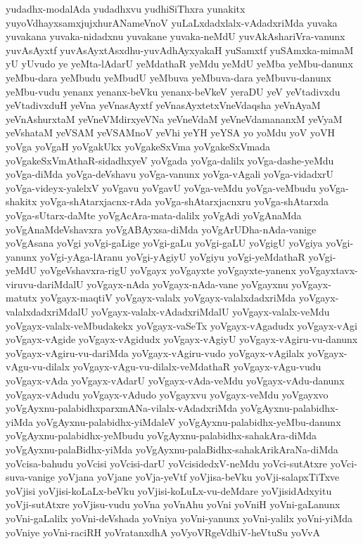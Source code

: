 {yudadhx-modalAda
yudadhxvu
yudhiSiThxra
yunakitx
yuyoVdhayxsamxjujxhurANameVnoV
yuLaLxdadxlalx-vAdadxriMda
yuvaka
yuvakana
yuvaka-nidadxnu
yuvakane
yuvaka-neMdU
yuvAkAshariVra-vanunx
yuvAsAyxtf
yuvAsAyxtAsxdhu-yuvAdhAyxyakaH
yuSamxtf
yuSAmxka-mimaM
yU
yUvudo
ye
yeMta-lAdarU
yeMdathaR
yeMdu
yeMdU
yeMba
yeMbu-danunx
yeMbu-dara
yeMbudu
yeMbudU
yeMbuva
yeMbuva-dara
yeMbuvu-danunx
yeMbu-vudu
yenanx
yenanx-beVku
yenanx-beVkeV
yeraDU
yeV
yeVtadivxdu
yeVtadivxduH
yeVna
yeVnasAyxtf
yeVnasAyxtetxVneVdaqsha
yeVnAyaM
yeVnAshurxtaM
yeVneVMdirxyeVNa
yeVneVdaM
yeVneVdamananxM
yeVyaM
yeVshataM
yeVSAM
yeVSAMnoV
yeVhi
yeYH
yeYSA
yo
yoMdu
yoV
yoVH
yoVga
yoVgaH
yoVgakUkx
yoVgakeSxVma
yoVgakeSxVmada
yoVgakeSxVmAthaR-sidadhxyeV
yoVgada
yoVga-dalilx
yoVga-dashe-yeMdu
yoVga-diMda
yoVga-deVshavu
yoVga-vanunx
yoVga-vAgali
yoVga-vidadxrU
yoVga-videyx-yalelxV
yoVgavu
yoVgavU
yoVga-veMdu
yoVga-veMbudu
yoVga-shakitx
yoVga-shAtarxjacnx-rAda
yoVga-shAtarxjacnxru
yoVga-shAtarxda
yoVga-sUtarx-daMte
yoVgAcAra-mata-dalilx
yoVgAdi
yoVgAnaMda
yoVgAnaMdeVshavxra
yoVgABAyxsa-diMda
yoVgArUDha-nAda-vanige
yoVgAsana
yoVgi
yoVgi-gaLige
yoVgi-gaLu
yoVgi-gaLU
yoVgigU
yoVgiya
yoVgi-yanunx
yoVgi-yAga-lAranu
yoVgi-yAgiyU
yoVgiyu
yoVgi-yeMdathaR
yoVgi-yeMdU
yoVgeVshavxra-rigU
yoVgayx
yoVgayxte
yoVgayxte-yanenx
yoVgayxtavx-viruvu-dariMdalU
yoVgayx-nAda
yoVgayx-nAda-vane
yoVgayxnu
yoVgayx-matutx
yoVgayx-maqtiV
yoVgayx-valalx
yoVgayx-valalxdadxriMda
yoVgayx-valalxdadxriMdalU
yoVgayx-valalx-vAdadxriMdalU
yoVgayx-valalx-veMdu
yoVgayx-valalx-veMbudakekx
yoVgayx-vaSeTx
yoVgayx-vAgadudx
yoVgayx-vAgi
yoVgayx-vAgide
yoVgayx-vAgidudx
yoVgayx-vAgiyU
yoVgayx-vAgiru-vu-danunx
yoVgayx-vAgiru-vu-dariMda
yoVgayx-vAgiru-vudo
yoVgayx-vAgilalx
yoVgayx-vAgu-vu-dilalx
yoVgayx-vAgu-vu-dilalx-veMdathaR
yoVgayx-vAgu-vudu
yoVgayx-vAda
yoVgayx-vAdarU
yoVgayx-vAda-veMdu
yoVgayx-vAdu-danunx
yoVgayx-vAdudu
yoVgayx-vAdudo
yoVgayxvu
yoVgayx-veMdu
yoVgayxvo
yoVgAyxnu-palabidhxparxmANa-vilalx-vAdadxriMda
yoVgAyxnu-palabidhx-yiMda
yoVgAyxnu-palabidhx-yiMdaleV
yoVgAyxnu-palabidhx-yeMbu-danunx
yoVgAyxnu-palabidhx-yeMbudu
yoVgAyxnu-palabidhx-sahakAra-diMda
yoVgAyxnu-palaBidhx-yiMda
yoVgAyxnu-palaBidhx-sahakArikAraNa-diMda
yoVcisa-bahudu
yoVcisi
yoVcisi-darU
yoVcisidedxV-neMdu
yoVci-sutAtxre
yoVci-suva-vanige
yoVjana
yoVjane
yoVja-yeVtf
yoVjisa-beVku
yoVji-salapxTiTxve
yoVjisi
yoVjisi-koLaLx-beVku
yoVjisi-koLuLx-vu-deMdare
yoVjisidAdxyitu
yoVji-sutAtxre
yoVjisu-vudu
yoVna
yoVnAhu
yoVni
yoVniH
yoVni-gaLanunx
yoVni-gaLalilx
yoVni-deVshada
yoVniya
yoVni-yanunx
yoVni-yalilx
yoVni-yiMda
yoVniye
yoVni-raciRH
yoVratanxdhA
yoVyoVRgeVdhiV-heVtuSu
yoVvA
}
